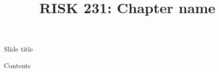 \documentclass{beamer}
\title{RISK 231: Chapter name}
\begin{document}
\maketitle

\begin{frame}{Slide title}

Contents

\end{frame}
\end{document}
